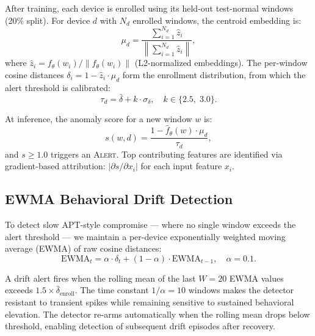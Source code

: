 \documentclass[journal,10pt,twoside]{IEEEtran}
\newcommand{\norm}[1]{\left\lVert #1 \right\rVert}
\begin{document}
After training, each device is enrolled using its held-out test-normal windows
(20\% split).
For device $d$ with $N_d$ enrolled windows, the centroid embedding is:
\begin{equation}
  \mu_d = \frac{\sum_{i=1}^{N_d} \hat{z}_i}
               {\left\lVert\sum_{i=1}^{N_d} \hat{z}_i\right\rVert},
  \label{eq:centroid}
\end{equation}
where $\hat{z}_i = f_\theta(w_i)/\norm{f_\theta(w_i)}$ (L2-normalized
embeddings).
The per-window cosine distances $\delta_i = 1 - \hat{z}_i \cdot \mu_d$ form
the enrollment distribution, from which the alert threshold is calibrated:
\begin{equation}
  \tau_d = \bar{\delta} + k \cdot \sigma_\delta,
  \quad k \in \{2.5,\;3.0\}.
  \label{eq:threshold}
\end{equation}

At inference, the anomaly score for a new window $w$ is:
\begin{equation}
  s(w, d) = \frac{1 - \hat{f}_\theta(w) \cdot \mu_d}{\tau_d},
  \label{eq:score}
\end{equation}
and $s \geq 1.0$ triggers an \textsc{Alert}.
Top contributing features are identified via gradient-based attribution:
$\left|\partial s / \partial x_i\right|$ for each input feature $x_i$.

\subsection{EWMA Behavioral Drift Detection}
\label{sec:ewma}

To detect slow APT-style compromise --- where no single window exceeds the
alert threshold --- we maintain a per-device exponentially weighted moving
average (EWMA) of raw cosine distances:
\begin{equation}
  \text{EWMA}_t = \alpha \cdot \delta_t + (1-\alpha) \cdot \text{EWMA}_{t-1},
  \quad \alpha = 0.1.
  \label{eq:ewma}
\end{equation}

A drift alert fires when the rolling mean of the last $W=20$ EWMA values
exceeds $1.5 \times \bar{\delta}_{\text{enroll}}$.
The time constant $1/\alpha = 10$ windows makes the detector resistant to
transient spikes while remaining sensitive to sustained behavioral elevation.
The detector re-arms automatically when the rolling mean drops below
threshold, enabling detection of subsequent drift episodes after recovery.

\end{document}
